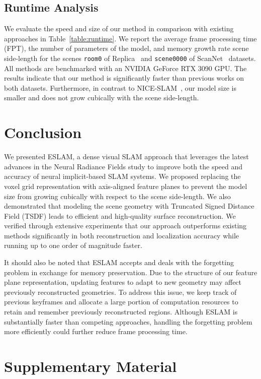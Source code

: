 \subsection{Runtime Analysis} \label{sec:c4_runtime}
We evaluate the speed and size of our method in comparison with existing approaches in Table~\ref{table:runtime}. We report the average frame processing time (FPT), the number of parameters of the model, and memory growth rate \wrt scene side-length for the scenes \texttt{room0} of Replica~\cite{replica19arxiv} and \texttt{scene0000} of ScanNet~\cite{dai2017scannet} datasets. All methods are benchmarked with an NVIDIA GeForce RTX 3090 GPU. The results indicate that our method is significantly faster than previous works on both datasets. Furthermore, in contrast to NICE-SLAM~\citep{zhu2022nice}, our model size is smaller and does not grow cubically with the scene side-length.

\section{Conclusion}
We presented ESLAM, a dense visual SLAM approach that leverages the latest advances in the Neural Radiance Fields study to improve both the speed and accuracy of neural implicit-based SLAM systems. We proposed replacing the voxel grid representation with axis-aligned feature planes to prevent the model size from growing cubically with respect to the scene side-length. We also demonstrated that modeling the scene geometry with Truncated Signed Distance Field (TSDF) leads to efficient and high-quality surface reconstruction. We verified through extensive experiments that our approach outperforms existing methods significantly in both reconstruction and localization accuracy while running up to one order of magnitude faster.

It should also be noted that ESLAM accepts and deals with the forgetting problem in exchange for memory preservation. Due to the structure of our feature plane representation, updating features to adapt to new geometry may affect previously reconstructed geometries. To address this issue, we keep track of previous keyframes and allocate a large portion of computation resources to retain and remember previously reconstructed regions. Although ESLAM is substantially faster than competing approaches, handling the forgetting problem more efficiently could further reduce frame processing time.

\clearpage

\section{Supplementary Material} \label{sec:c4_supp}

